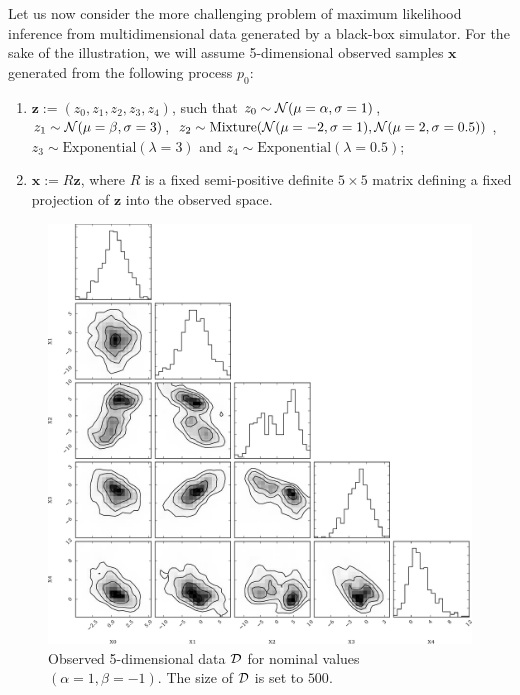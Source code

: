 \documentclass[12pt]{article}
\numberwithin{equation}{section}
\theoremstyle{plain}
\begin{document}
Let us now consider the more challenging problem of maximum likelihood
inference from multidimensional data generated by a black-box simulator.
For the sake of the illustration, we will assume 5-dimensional observed samples $\mathbf{x}$ generated
from the following process $p_0$:
    \begin{enumerate}
        \item $\mathbf{z} := (z_0, z_1, z_2, z_3, z_4)$, such that
            $z_0 \sim {\cal N}(\mu=\alpha, \sigma=1)$,
            $z_1 \sim {\cal N}(\mu=\beta, \sigma=3)$,
            $z_2 \sim {\text{Mixture}}({\cal N}(\mu=-2, \sigma=1), {\cal N}(\mu=2, \sigma=0.5))$,
            $z_3 \sim {\text{Exponential}(\lambda=3)}$ and
            $z_4 \sim {\text{Exponential}(\lambda=0.5)}$;
        \item $\mathbf{x} := R  \mathbf{z}$, where $R$ is a fixed
        semi-positive definite $5 \times 5$ matrix defining a fixed projection
        of $\mathbf{z}$ into the observed space.
    \end{enumerate}

\begin{figure}
    \centering
    \includegraphics[width=1.0\textwidth]{figures/fig4.pdf}
    \caption{Observed 5-dimensional data ${\cal D}$ for nominal values $(\alpha=1, \beta=-1)$. The size of ${\cal D}$ is set to $500$.}
    \label{fig:4}
\end{figure}
\end{document}

